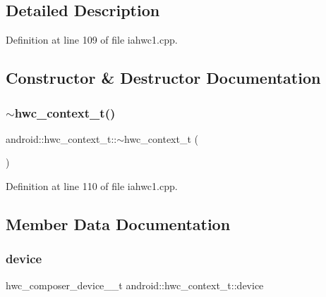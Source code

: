 \subsection{Detailed Description}


Definition at line 109 of file iahwc1.\+cpp.



\subsection{Constructor \& Destructor Documentation}
\mbox{\label{structandroid_1_1hwc__context__t_a0661dcf76ae2fbbf413231f92884b95e}} 
\subsubsection{\texorpdfstring{$\sim$hwc\+\_\+context\+\_\+t()}{~hwc\_context\_t()}}
{\footnotesize\ttfamily android\+::hwc\+\_\+context\+\_\+t\+::$\sim$hwc\+\_\+context\+\_\+t (\begin{DoxyParamCaption}{ }\end{DoxyParamCaption})\hspace{0.3cm}{\ttfamily [inline]}}



Definition at line 110 of file iahwc1.\+cpp.


\begin{DoxyCode}{0}
\end{DoxyCode}


\subsection{Member Data Documentation}
\mbox{\label{structandroid_1_1hwc__context__t_aa6c71037a0f08ff676446e7550d6dc6e}} 
\subsubsection{\texorpdfstring{device}{device}}
{\footnotesize\ttfamily hwc\+\_\+composer\+\_\+device\+\_\+\_\+t android\+::hwc\+\_\+context\+\_\+t\+::device}



